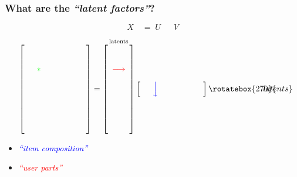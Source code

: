 \documentclass[xcolor={dvipsnames}]{beamer}
\begin{document}
\frame
{
\frametitle{What are the \emph{``latent factors''}?}

\vspace{-2em}

\Huge
$$ \;\;X \quad = \; U \quad\;\; V\;\;$$ 

\normalsize
$$
\;\;\;\left[
\begin{array}{ccccccc}
&&&&&&\\
&&&&&&\\
&\textcolor{green}{*}&&&&&\\
&&&&&&\\
&&&&&&\\
&&&&&&\\
&&&&&&\\
&&&&&&\\
&&&&&&\\
\end{array}
\right] = 
\overset{\text{latents}}{
\left[
\begin{array}{c}
\\
\\
\textcolor{red}{\longrightarrow} \\
\\
\\
\\
\\
\\
\\
\end{array}
\right]}  
\left[
\begin{array}{ccccccc}
&\textcolor{blue}{\Big\downarrow}&&&&&\\
\end{array}
\right]\rotatebox{270}{\hspace{-1.6em} \scriptsize latents}
$$

\vspace{.5em}
\begin{itemize}
\item[] \hspace{.85in}\textcolor{blue}{\normalsize\emph{``item composition''}}
\item[] \normalsize\hspace{1.55in}\textcolor{red}{\emph{``user parts''}} \tiny {} 
\end{itemize}

}
\end{document}

